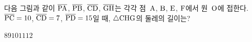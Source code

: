 다음 그림과 같이 $\overline{\mathrm{PA}}$, $\overline{\mathrm{PB}}$, $\overline{\mathrm{CD}}$, $\overline{\mathrm{GH}}$는 각각 점~$\mathrm{A}$, $\mathrm{B}$, $\mathrm{E}$, $\mathrm{F}$에서 원~$\mathrm{O}$에 접한다. $\overline{\mathrm{PC}}=10$, $\overline{\mathrm{CD}}=7$, $\overline{\mathrm{PD}}=15$일 때, $\triangle\mathrm{CHG}$의 둘레의 길이는?
\par\smallskip\begin{center}\resizebox{\ifdim\width>\linewidth\linewidth\else\width\fi}{!}{}\end{center}
\begin{choices32}{$8$}{$9$}{$10$}{$11$}{$12$}\end{choices32}
